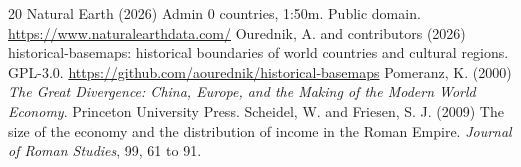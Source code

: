 \documentclass[11pt,a4paper]{article}
\begin{document}
\begin{thebibliography}{20}
 Natural Earth (2026) Admin 0 countries, 1:50m. Public domain. \url{https://www.naturalearthdata.com/}
 Ourednik, A. and contributors (2026) historical-basemaps: historical boundaries of world countries and cultural regions. GPL-3.0. \url{https://github.com/aourednik/historical-basemaps}
 Pomeranz, K. (2000) \textit{The Great Divergence: China, Europe, and the Making of the Modern World Economy}. Princeton University Press.
 Scheidel, W. and Friesen, S. J. (2009) The size of the economy and the distribution of income in the Roman Empire. \textit{Journal of Roman Studies}, 99, 61 to 91.
\end{thebibliography}
\end{document}
